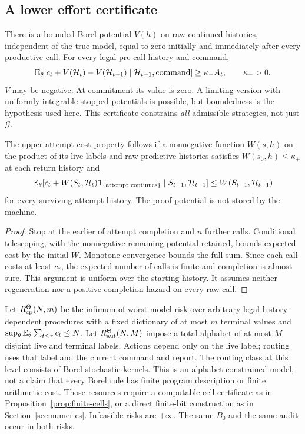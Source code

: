 \subsection*{A lower effort certificate}
There is a bounded Borel potential $V(h)$ on raw continued histories, independent of the true model, equal to zero initially and immediately after every productive call. For every legal pre-call history and command,
\begin{equation}\label{eq:effort-drift}
 \mathbb E_\theta[c_t+V(\mathcal H_t)-V(\mathcal H_{t-1})
            \mid\mathcal H_{t-1},\text{command}]
 \ge\kappa_- A_t,\qquad \kappa_->0.
\end{equation}
$V$ may be negative. At commitment its value is zero. A limiting version with uniformly integrable stopped potentials is possible, but boundedness is the hypothesis used here. This certificate constrains \emph{all} admissible strategies, not just $\mathcal G$.

\begin{lemma}\label{lem:navigator}
The upper attempt-cost property follows if a nonnegative function $W(s,h)$ on the product of its live labels and raw predictive histories satisfies $W(s_0,h)\le\kappa_+$ at each return history and
\[
 \mathbb E_\theta[c_t+W(S_t,\mathcal H_t)\mathbf1_{\{\text{attempt continues}\}}
      \mid S_{t-1},\mathcal H_{t-1}]
 \le W(S_{t-1},\mathcal H_{t-1})
\]
for every surviving attempt history. The proof potential is not stored by the machine.
\end{lemma}
\begin{proof}
Stop at the earlier of attempt completion and $n$ further calls. Conditional telescoping, with the nonnegative remaining potential retained, bounds expected cost by the initial $W$. Monotone convergence bounds the full sum. Since each call costs at least $c_*$, the expected number of calls is finite and completion is almost sure. This argument is uniform over the starting history. It assumes neither regeneration nor a positive completion hazard on every raw call.
\end{proof}

Let $R_{\mathrm{cp}}^\Theta(N,m)$ be the infimum of worst-model risk over arbitrary legal history-dependent procedures with a fixed dictionary of at most $m$ terminal values and $\sup_\theta\mathbb E_\theta\sum_{t\le\tau}c_t\le N$. Let $R_{\mathrm{aut}}^\Theta(N,M)$ impose a total alphabet of at most $M$ disjoint live and terminal labels. Actions depend only on the live label; routing uses that label and the current command and report. The routing class at this level consists of Borel stochastic kernels. This is an alphabet-constrained model, not a claim that every Borel rule has finite program description or finite arithmetic cost. Those resources require a computable cell certificate as in Proposition~\ref{prop:finite-cells}, or a direct finite-bit construction as in Section~\ref{sec:numerics}. Infeasible risks are $+\infty$. The same $B_0$ and the same audit occur in both risks.
